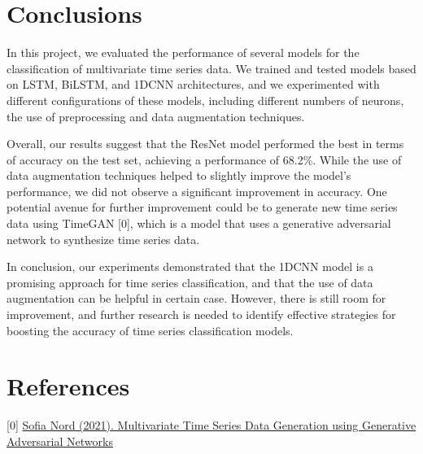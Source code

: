 \documentclass[11pt, oneside]{article}
\begin{document}
\section{Conclusions}
In this project, we evaluated the performance of several models for the classification of multivariate time series data. We trained and tested models based on LSTM, BiLSTM, and 1DCNN architectures, and we experimented with different configurations of these models, including different numbers of neurons, the use of preprocessing and data augmentation techniques.

Overall, our results suggest that the ResNet model performed the best in terms of accuracy on the test set, achieving a performance of 68.2\%. While the use of data augmentation techniques helped to slightly improve the model's performance, we did not observe a significant improvement in accuracy. One potential avenue for further improvement could be to generate new time series data using TimeGAN [0], which is a model that uses a generative adversarial network to synthesize time series data.

In conclusion, our experiments demonstrated that the 1DCNN model is a promising approach for time series classification, and that the use of data augmentation can be helpful in certain case. However, there is still room for improvement, and further research is needed to identify effective strategies for boosting the accuracy of time series classification models.
\section*{References}
[0] \href{http://kth.diva-portal.org/smash/get/diva2:1598158/FULLTEXT01.pdf}{Sofia Nord (2021). Multivariate Time Series Data
Generation using Generative
Adversarial Networks
}\\
\end{document}
